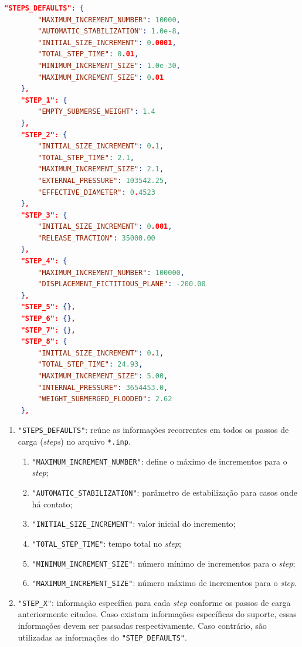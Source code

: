 \begin{lstlisting}[firstnumber=137, language=json, label={tab:jdsn-arquivojson5}, caption={Exemplo de arquivo de entrada de dados - Parte 5/7}]
    "STEPS_DEFAULTS": {
        "MAXIMUM_INCREMENT_NUMBER": 10000,
        "AUTOMATIC_STABILIZATION": 1.0e-8,
        "INITIAL_SIZE_INCREMENT": 0.0001,
        "TOTAL_STEP_TIME": 0.01,
        "MINIMUM_INCREMENT_SIZE": 1.0e-30,
        "MAXIMUM_INCREMENT_SIZE": 0.01
    },
    "STEP_1": {
        "EMPTY_SUBMERSE_WEIGHT": 1.4
    },
    "STEP_2": {
        "INITIAL_SIZE_INCREMENT": 0.1,
        "TOTAL_STEP_TIME": 2.1,
        "MAXIMUM_INCREMENT_SIZE": 2.1,
        "EXTERNAL_PRESSURE": 103542.25,
        "EFFECTIVE_DIAMETER": 0.4523
    },
    "STEP_3": {
        "INITIAL_SIZE_INCREMENT": 0.001,
        "RELEASE_TRACTION": 35000.00
    },
    "STEP_4": {
        "MAXIMUM_INCREMENT_NUMBER": 100000,
        "DISPLACEMENT_FICTITIOUS_PLANE": -200.00
    },
    "STEP_5": {},
    "STEP_6": {},
    "STEP_7": {},
    "STEP_8": {
        "INITIAL_SIZE_INCREMENT": 0.1,
        "TOTAL_STEP_TIME": 24.93,
        "MAXIMUM_INCREMENT_SIZE": 5.00,
        "INTERNAL_PRESSURE": 3654453.0,
        "WEIGHT_SUBMERGED_FLOODED": 2.62
    },
\end{lstlisting}

\begin{enumerate}
    \item \texttt{"STEPS\_DEFAULTS"}\label{step_default}: reúne as informações recorrentes em todos os passos de carga (\textit{steps}) no arquivo \texttt{*.inp}.
    \begin{enumerate}
        \item \texttt{"MAXIMUM\_INCREMENT\_NUMBER"}: define o máximo de incrementos para o \textit{step};
        \item \texttt{"AUTOMATIC\_STABILIZATION"}: parâmetro de estabilização para casos onde há contato;
        \item \texttt{"INITIAL\_SIZE\_INCREMENT"}: valor inicial do incremento;
        \item \texttt{"TOTAL\_STEP\_TIME"}: tempo total no \textit{step};
        \item \texttt{"MINIMUM\_INCREMENT\_SIZE"}: número mínimo de incrementos para o \textit{step};
        \item \texttt{"MAXIMUM\_INCREMENT\_SIZE"}: número máximo de incrementos para o \textit{step}.
    \end{enumerate}
    \item \texttt{"STEP\_X"}: informação específica para cada \textit{step} conforme os passos de carga anteriormente citados. Caso existam informações específicas do suporte, essas informações devem ser passadas respectivamente. Caso contrário, são utilizadas as informações do \texttt{"STEP\_DEFAULTS"}.
\end{enumerate}

